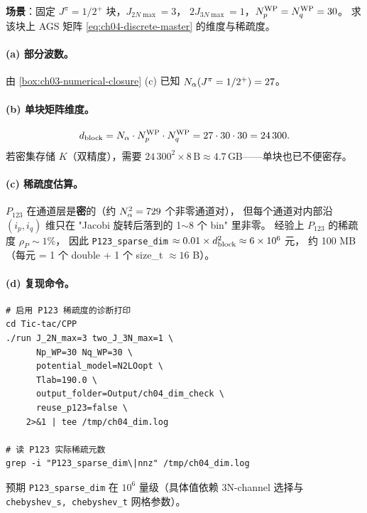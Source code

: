 \begin{numericalbox}[label={box:ch04-numerical-closure}]
\textbf{场景}：固定 \(J^\pi = 1/2^+\) 块，\(J_{2N\max} = 3\)，
\(2J_{3N\max} = 1\)，\(N_p^{\rm WP} = N_q^{\rm WP} = 30\)。
求该块上 AGS 矩阵 \cref{eq:ch04-discrete-master} 的维度与稀疏度。

\paragraph{(a) 部分波数。}
由 \cref{box:ch03-numerical-closure} (c) 已知 \(N_\alpha(J^\pi = 1/2^+) = 27\)。

\paragraph{(b) 单块矩阵维度。}
\begin{equation}
d_{\rm block} = N_\alpha \cdot N_p^{\rm WP} \cdot N_q^{\rm WP}
= 27 \cdot 30 \cdot 30 = 24\,300.
\end{equation}
若密集存储 \(K\)（双精度），需要 \(24\,300^2 \times 8\,\text{B} \approx 4.7\,\text{GB}\)——单块也已不便密存。

\paragraph{(c) 稀疏度估算。}
\(P_{123}\) 在通道层是\textbf{密}的（约 \(N_\alpha^2 = 729\) 个非零通道对），
但每个通道对内部沿 \((i_p, i_q)\) 维只在 "Jacobi 旋转后落到的 1\(\sim\)8 个 bin"
里非零。
经验上 \(P_{123}\) 的稀疏度 \(\rho_P \sim 1\%\)，
因此 \texttt{P123\_sparse\_dim} \(\approx 0.01 \times d_{\rm block}^2 \approx 6 \times 10^6\) 元，
约 100 MB（每元 = 1 个 double + 1 个 size\_t \(\approx 16\) B）。

\paragraph{(d) 复现命令。}
\begin{lstlisting}[style=config]
# 启用 P123 稀疏度的诊断打印
cd Tic-tac/CPP
./run J_2N_max=3 two_J_3N_max=1 \
      Np_WP=30 Nq_WP=30 \
      potential_model=N2LOopt \
      Tlab=190.0 \
      output_folder=Output/ch04_dim_check \
      reuse_p123=false \
    2>&1 | tee /tmp/ch04_dim.log

# 读 P123 实际稀疏元数
grep -i "P123_sparse_dim\|nnz" /tmp/ch04_dim.log
\end{lstlisting}
预期 \texttt{P123\_sparse\_dim} 在 \(10^6\) 量级（具体值依赖
3N-channel 选择与 \texttt{chebyshev\_s, chebyshev\_t} 网格参数）。

\end{numericalbox}

